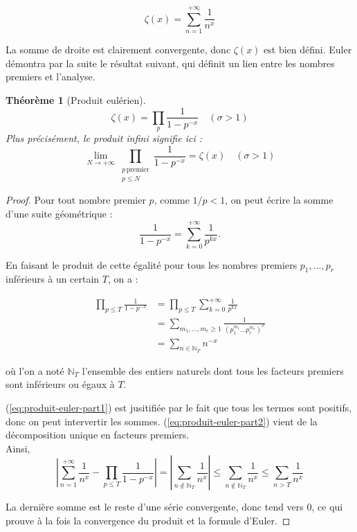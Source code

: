 \documentclass[french]{report}
\newtheorem{theorem}{Théorème}[section]
\begin{document}
\[ \zeta(x) = \sum_{n=1}^{+\infty}\frac{1}{n^x} \]

La somme de droite est clairement convergente, donc $\zeta(x)$ est bien défini. Euler démontra par la suite le résultat suivant, qui définit un lien entre les nombres premiers et l'analyse.

\begin{theorem}[Produit eulérien]\label{thm:produit-eulerien-reel}
  \[ \zeta(x) = \prod_p\frac{1}{1-p^{-x}}\quad(\sigma>1) \]
  Plus précisément, le produit infini signifie ici :
  \[ \lim_{N\to+\infty}\prod_{\substack{p\,\mathrm{premier}\\p\leq N}}\frac{1}{1-p^{-x}}=\zeta(x)\quad(\sigma>1) \]
\end{theorem}

\begin{proof}
  Pour tout nombre premier $p$, comme $1/p<1$, on peut écrire la somme d'une suite géométrique :
  \[ \frac{1}{1-p^{-x}}=\sum_{k=0}^{+\infty}\frac{1}{p^{kx}}. \]

  En faisant le produit de cette égalité pour tous les nombres premiers $p_1, ..., p_r$ inférieurs à un certain $T$, on a :
  
  \begin{align}
    \prod_{p\leq T}\frac{1}{1-p^{-x}}
    &= \prod_{p\leq T}\sum_{k=0}^{+\infty}\frac{1}{p^{kx}}  \\
    &= \sum_{m_1,...,m_r\geq1}\frac{1}{(p_1^{m_1}...p_r^{m_r})^x} \label{eq:produit-euler-part1} \\
    &= \sum_{n\in\mathbb{N}_T}n^{-x} \label{eq:produit-euler-part2}
  \end{align}

  où l'on a noté $\mathbb{N}_T$ l'ensemble des entiers naturels dont tous les facteurs premiers sont inférieurs ou égaux à $T$.

  (\ref{eq:produit-euler-part1}) est jusitifiée par le fait que tous les termes sont positifs, donc on peut intervertir les sommes. (\ref{eq:produit-euler-part2}) vient de la décomposition unique en facteurs premiers.
  \\

  Ainsi,
  \[ \left|\sum_{n=1}^{+\infty}\frac{1}{n^x}-\prod_{p\leq T}\frac{1}{1-p^{-x}}\right|
  = \left|\sum_{n\notin\mathbb{N}_T}\frac{1}{n^x}\right|
  \leq \sum_{n\notin\mathbb{N}_T}\frac{1}{n^x}
  \leq \sum_{n>T}\frac{1}{n^x}
  \]

  La dernière somme est le reste d'une série convergente, donc tend vers 0, ce qui prouve à la fois la convergence du produit et la formule d'Euler.
\end{proof}
\end{document}
